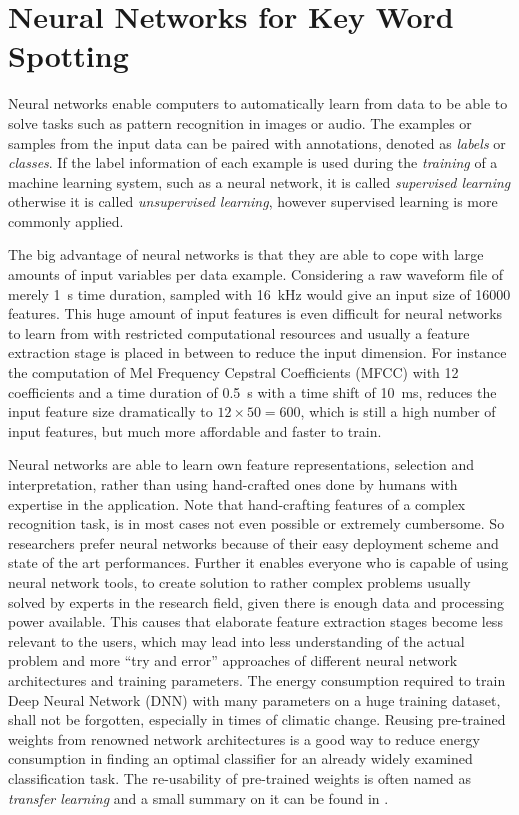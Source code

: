 
\section{Neural Networks for Key Word Spotting}\label{sec:intro_nn}
\thesisStateRevised
Neural networks enable computers to automatically learn from data to be able to solve tasks such as pattern recognition in images or audio.
The examples or samples from the input data can be paired with annotations, denoted as \emph{labels} or \emph{classes}.
If the label information of each example is used during the \emph{training} of a machine learning system, such as a neural network, it is called \emph{supervised learning} otherwise it is called \emph{unsupervised learning}, however supervised learning is more commonly applied.

The big advantage of neural networks is that they are able to cope with large amounts of input variables per data example.
Considering a raw waveform file of merely \SI{1}{s} time duration, sampled with \SI{16}{\kilo\hertz} would give an input size of 16000 features.
This huge amount of input features is even difficult for neural networks to learn from with restricted computational resources and usually a feature extraction stage is placed in between to reduce the input dimension.
For instance the computation of Mel Frequency Cepstral Coefficients (MFCC) with 12 coefficients and a time duration of \SI{0.5}{s} with a time shift of \SI{10}{\milli\second}, reduces the input feature size dramatically to $12 \times 50 = 600$, which is still a high number of input features, but much more affordable and faster to train.

Neural networks are able to learn own feature representations, selection and interpretation, rather than using hand-crafted ones done by humans with expertise in the application.
Note that hand-crafting features of a complex recognition task, is in most cases not even possible or extremely cumbersome.
So researchers prefer neural networks because of their easy deployment scheme and state of the art performances.
Further it enables everyone who is capable of using neural network tools, to create solution to rather complex problems usually solved by experts in the research field, given there is enough data and processing power available.
This causes that elaborate feature extraction stages become less relevant to the users, which may lead into less understanding of the actual problem and more \enquote{try and error} approaches of different neural network architectures and training parameters.
The energy consumption required to train Deep Neural Network (DNN) with many parameters on a huge training dataset, shall not be forgotten, especially in times of climatic change.
Reusing pre-trained weights from renowned network architectures is a good way to reduce energy consumption in finding an optimal classifier for an already widely examined classification task.
The re-usability of pre-trained weights is often named as \emph{transfer learning} and a small summary on it can be found in \cite{TransferLearning}.

